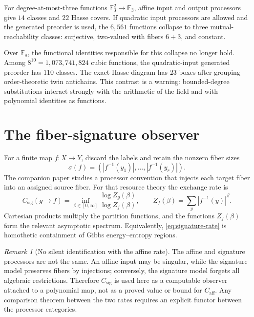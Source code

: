 \documentclass[11pt]{article}
\theoremstyle{definition}
\theoremstyle{plain}
\theoremstyle{remark}
\newtheorem{remark}[definition]{Remark}
\newcommand{\F}{\mathbb F}
\newcommand{\caff}{C_{\mathrm{aff}}}
\newcommand{\csig}{C_{\mathrm{sig}}}
\begin{document}
\clearpage

For degree-at-most-three functions \(\F_3^2\to\F_3\), affine input and output
processors give \(14\) classes and \(22\) Hasse covers.  If quadratic input
processors are allowed and the generated preorder is used, the \(6{,}561\)
functions collapse to three mutual-reachability classes: surjective,
two-valued with fibers \(6+3\), and constant.

Over \(\F_8\), the functional identities responsible for this collapse no
longer hold.  Among \(8^{10}=1{,}073{,}741{,}824\) cubic functions, the
quadratic-input generated preorder has \(110\) classes.  The exact Hasse
diagram has \(23\) boxes after grouping order-theoretic twin antichains.  This
contrast is a warning: bounded-degree substitutions interact strongly with
the arithmetic of the field and with polynomial identities as functions.

\section{The fiber-signature observer}
\label{sec:signature-observer}

For a finite map \(f:X\to Y\), discard the labels and retain the nonzero fiber
sizes
\[
  \sigma(f)=(|f^{-1}(y_1)|,\ldots,|f^{-1}(y_r)|).
\]
The companion paper \cite{vorozhtsov-exchange} studies a processor convention
that injects each target fiber into an assigned source fiber.  For that
resource theory the exchange rate is
\begin{equation}
  \csig(g\to f)
  =\inf_{\beta\in[0,\infty]}
  \frac{\log Z_g(\beta)}{\log Z_f(\beta)},
  \qquad
  Z_f(\beta)=\sum_y|f^{-1}(y)|^\beta.
  \label{eq:signature-rate}
\end{equation}
Cartesian products multiply the partition functions, and the functions
\(Z_f(\beta)\) form the relevant asymptotic spectrum.  Equivalently,
\eqref{eq:signature-rate} is homothetic containment of Gibbs
energy--entropy regions.

\begin{remark}[No silent identification with the affine rate]
\label{rem:no-silent-identification}
The affine and signature processors are not the same.  An affine input may be
singular, while the signature model preserves fibers by injections; conversely,
the signature model forgets all algebraic restrictions.  Therefore
\(\csig\) is used here as a computable observer attached to a polynomial map,
not as a proved value or bound for \(\caff\).  Any comparison theorem between
the two rates requires an explicit functor between the processor categories.
\end{remark}
\end{document}
